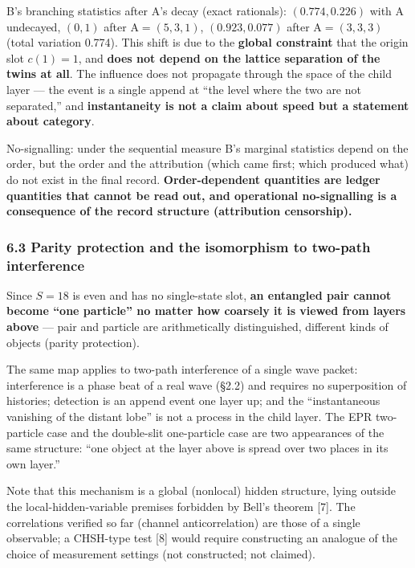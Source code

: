 \documentclass[
]{article}
\begin{document}
B's branching statistics after A's decay (exact rationals):
\((0.774,0.226)\) with A undecayed, \((0,1)\) after A\(=(5,3,1)\),
\((0.923,0.077)\) after A\(=(3,3,3)\) (total variation 0.774). This
shift is due to the \textbf{global constraint} that the origin slot
\(c(1)=1\), and \textbf{does not depend on the lattice separation of the
twins at all}. The influence does not propagate through the space of the
child layer --- the event is a single append at ``the level where the
two are not separated,'' and \textbf{instantaneity is not a claim about
speed but a statement about category}.

No-signalling: under the sequential measure B's marginal statistics
depend on the order, but the order and the attribution (which came
first; which produced what) do not exist in the final record.
\textbf{Order-dependent quantities are ledger quantities that cannot be
read out, and operational no-signalling is a consequence of the record
structure (attribution censorship).}

\subsubsection{6.3 Parity protection and the isomorphism to two-path
interference}\label{parity-protection-and-the-isomorphism-to-two-path-interference}

Since \(S=18\) is even and has no single-state slot, \textbf{an
entangled pair cannot become ``one particle'' no matter how coarsely it
is viewed from layers above} --- pair and particle are arithmetically
distinguished, different kinds of objects (parity protection).

The same map applies to two-path interference of a single wave packet:
interference is a phase beat of a real wave (§2.2) and requires no
superposition of histories; detection is an append event one layer up;
and the ``instantaneous vanishing of the distant lobe'' is not a process
in the child layer. The EPR two-particle case and the double-slit
one-particle case are two appearances of the same structure: ``one
object at the layer above is spread over two places in its own layer.''

Note that this mechanism is a global (nonlocal) hidden structure, lying
outside the local-hidden-variable premises forbidden by Bell's theorem
{[}7{]}. The correlations verified so far (channel anticorrelation) are
those of a single observable; a CHSH-type test {[}8{]} would require
constructing an analogue of the choice of measurement settings (not
constructed; not claimed).
\end{document}
